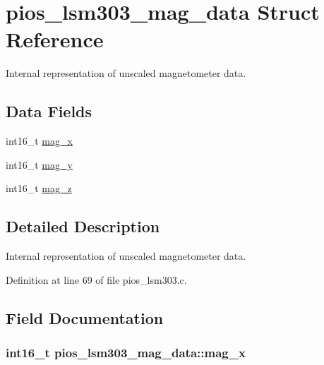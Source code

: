 \hypertarget{structpios__lsm303__mag__data}{\section{pios\-\_\-lsm303\-\_\-mag\-\_\-data \-Struct \-Reference}
\label{structpios__lsm303__mag__data}
}


\-Internal representation of unscaled magnetometer data.  


\subsection*{\-Data \-Fields}
\begin{DoxyCompactItemize}
\item 
int16\-\_\-t \hyperlink{structpios__lsm303__mag__data_ae632e8723dee3280f6672412cf5b67f1}{mag\-\_\-x}
\item 
int16\-\_\-t \hyperlink{structpios__lsm303__mag__data_a3365812478c4eab5da066f69f10ceacf}{mag\-\_\-y}
\item 
int16\-\_\-t \hyperlink{structpios__lsm303__mag__data_a2989fa1111551a8ec9135c7446bb0a03}{mag\-\_\-z}
\end{DoxyCompactItemize}


\subsection{\-Detailed \-Description}
\-Internal representation of unscaled magnetometer data. 

\-Definition at line 69 of file pios\-\_\-lsm303.\-c.



\subsection{\-Field \-Documentation}
\hypertarget{structpios__lsm303__mag__data_ae632e8723dee3280f6672412cf5b67f1}{
\subsubsection[{mag\-\_\-x}]{\setlength{\rightskip}{0pt plus 5cm}int16\-\_\-t {\bf pios\-\_\-lsm303\-\_\-mag\-\_\-data\-::mag\-\_\-x}}}\label{structpios__lsm303__mag__data_ae632e8723dee3280f6672412cf5b67f1}


